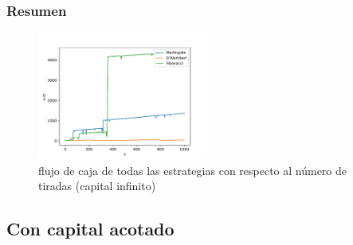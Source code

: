 \documentclass{article}
\begin{document}
  \subsubsection{Resumen}
  \begin{figure}[H]
    \centering
    \includegraphics[width=0.5\textwidth]{generated/capital-no acotado.pdf}
    \caption{flujo de caja de todas las estrategias con respecto al número de tiradas (capital infinito)}
  \end{figure}

  \subsection{Con capital acotado}
\end{document}
